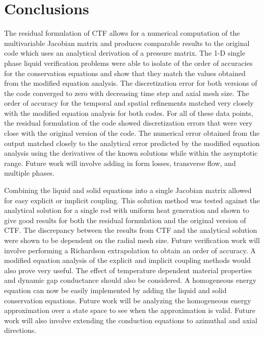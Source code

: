 \vspace*{-80mm}
\chapter{Conclusions} \label{chapter7:uniform_heating}
 

The residual formulation of CTF allows for a numerical computation of the
multivariable Jacobian matrix and produces comparable results to the original
code which uses an analytical derivation of a pressure matrix. The 1-D
single phase liquid verification problems were able to
isolate of the order of accuracies for the conservation equations and show that
they match the values obtained from the modified equation analysis. The
discretization error for both versions of the code converged to zero with
decreasing time step and axial mesh size. The order of accuracy for the temporal
and spatial refinements matched very closely with the modified equation analysis
for both codes. For all of these data points, the residual formulation of the
code showed discretization errors that were very close with the original version
of the code. The numerical error obtained from the output matched closely to
the analytical error predicted by the modified equation analysis using the
derivatives of the known solutions while within the asymptotic range. Future
work will involve adding in form losses, transverse flow, and multiple phases.

Combining the liquid and solid equations into a single Jacobian matrix allowed
for easy explicit or implicit coupling. This solution method was tested against
the analytical solution for a single rod with uniform heat generation and shown
to give good results for both the residual formulation and the original version
of CTF. The discrepancy between the results from CTF and the analytical solution
were shown to be dependent on the radial mesh size. Future verification work
will involve performing a Richardson extrapolation to obtain an order of
accuracy. A modified equation analysis of the explicit and implicit coupling
methods would also prove very useful. The effect of temperature dependent
material properties and dynamic gap conductance should also be considered. A
homogeneous energy equation can now be easily implemented by adding the liquid
and solid conservation equations. Future work will be analyzing the homogeneous
energy approximation over a state space to see when the approximation is valid.
Future work will also involve extending the conduction equations to azimuthal
and axial directions.


